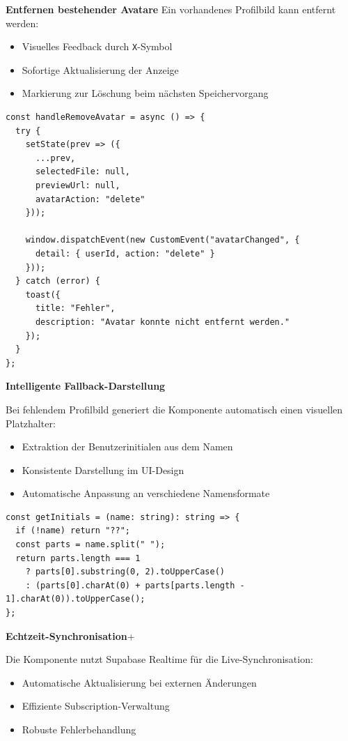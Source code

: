 \begin{inhalt}
\textbf{Entfernen bestehender Avatare}
\vspace{0.15cm}
Ein vorhandenes Profilbild kann entfernt werden:
\begin{itemize}
    \item Visuelles Feedback durch \texttt{X}-Symbol
    \item Sofortige Aktualisierung der Anzeige
    \item Markierung zur Löschung beim nächsten Speichervorgang
\end{itemize}

\begin{lstlisting}[style=mytsx, label={lst:avatar_delete}]
const handleRemoveAvatar = async () => {
  try {
    setState(prev => ({
      ...prev,
      selectedFile: null,
      previewUrl: null,
      avatarAction: "delete"
    }));
    
    window.dispatchEvent(new CustomEvent("avatarChanged", {
      detail: { userId, action: "delete" }
    }));
  } catch (error) {
    toast({
      title: "Fehler",
      description: "Avatar konnte nicht entfernt werden."
    });
  }
};
\end{lstlisting}

\textbf{Intelligente Fallback-Darstellung}

\vspace{0.15cm}

Bei fehlendem Profilbild generiert die Komponente automatisch einen visuellen Platzhalter:
\begin{itemize}
    \item Extraktion der Benutzerinitialen aus dem Namen
    \item Konsistente Darstellung im UI-Design
    \item Automatische Anpassung an verschiedene Namensformate
\end{itemize}

\begin{lstlisting}[style=mytsx, label={lst:avatar_initials}]
const getInitials = (name: string): string => {
  if (!name) return "??";
  const parts = name.split(" ");
  return parts.length === 1
    ? parts[0].substring(0, 2).toUpperCase()
    : (parts[0].charAt(0) + parts[parts.length - 1].charAt(0)).toUpperCase();
};
\end{lstlisting}

\textbf{Echtzeit-Synchronisation}+

\vspace{0.15cm}

Die Komponente nutzt Supabase Realtime für die Live-Synchronisation:
\begin{itemize}
    \item Automatische Aktualisierung bei externen Änderungen
    \item Effiziente Subscription-Verwaltung
    \item Robuste Fehlerbehandlung
\end{itemize}


\end{inhalt}
